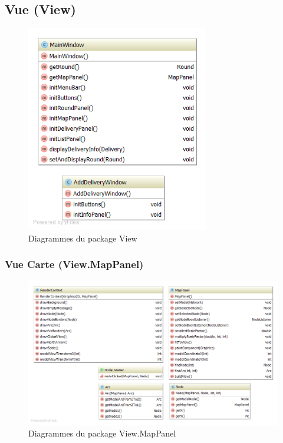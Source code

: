 \subsection{Vue (View)}

\begin{figure}[h]
    \centering
    \includegraphics[width=80mm]{../diagrams/classes_packages/classes_packages/view/view.png}
    \caption{Diagrammes du package View}
    \label{diagram:uml_view}
\end{figure}
\pagebreak

\subsubsection{Vue Carte (View.MapPanel)}

\begin{figure}[h]
    \centering
    \includegraphics[width=160mm]{../diagrams/classes_packages/classes_packages/view/package_map.png}
    \caption{Diagrammes du package View.MapPanel}
    \label{diagram:uml_view_map}
\end{figure}
\pagebreak

